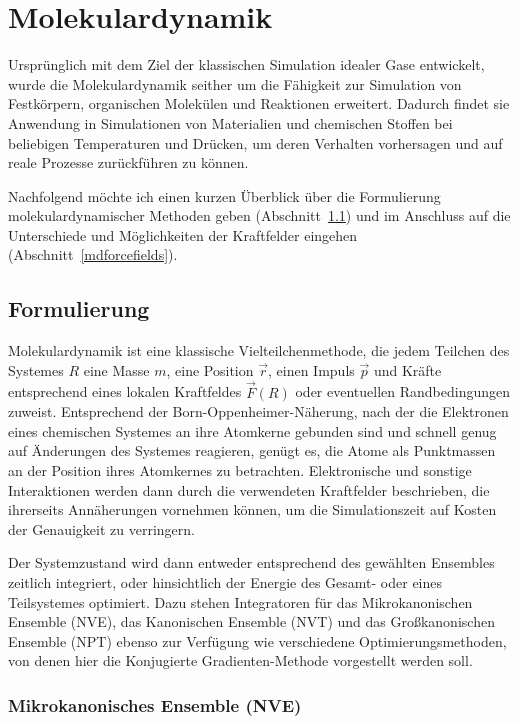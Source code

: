 \section{Molekulardynamik}
\label{md}

Ursprünglich mit dem Ziel der klassischen Simulation idealer Gase entwickelt, wurde die Molekulardynamik seither um die Fähigkeit zur Simulation von Festkörpern, organischen Molekülen und Reaktionen erweitert.
Dadurch findet sie Anwendung in Simulationen von Materialien und chemischen Stoffen bei beliebigen Temperaturen und Drücken, um deren Verhalten vorhersagen und auf reale Prozesse zurückführen zu können.

Nachfolgend möchte ich einen kurzen Überblick über die Formulierung molekulardynamischer Methoden geben (Abschnitt~\ref{mdformulation}) und im Anschluss auf die Unterschiede und Möglichkeiten der Kraftfelder eingehen (Abschnitt~\ref{mdforcefields}).

\subsection{Formulierung}
\label{mdformulation}

Molekulardynamik ist eine klassische Vielteilchenmethode, die jedem Teilchen des Systemes $R$ eine Masse $m$, eine Position $\vec r$, einen Impuls $\vec p$ und Kräfte entsprechend eines lokalen Kraftfeldes $\vec{F}(R)$ oder eventuellen Randbedingungen zuweist.
Entsprechend der Born-Oppenheimer-Näherung, nach der die Elektronen eines chemischen Systemes an ihre Atomkerne gebunden sind und schnell genug auf Änderungen des Systemes reagieren, genügt es, die Atome als Punktmassen an der Position ihres Atomkernes zu betrachten.
Elektronische und sonstige Interaktionen werden dann durch die verwendeten Kraftfelder beschrieben, die ihrerseits Annäherungen vornehmen können, um die Simulationszeit auf Kosten der Genauigkeit zu verringern.

Der Systemzustand wird dann entweder entsprechend des gewählten Ensembles zeitlich integriert, oder hinsichtlich der Energie des Gesamt- oder eines Teilsystemes optimiert.
Dazu stehen Integratoren für das Mikrokanonischen Ensemble (NVE), das Kanonischen Ensemble (NVT) und das Großkanonischen Ensemble (NPT) ebenso zur Verfügung wie verschiedene Optimierungsmethoden, von denen hier die Konjugierte Gradienten-Methode vorgestellt werden soll.

\subsubsection{Mikrokanonisches Ensemble (NVE)}

